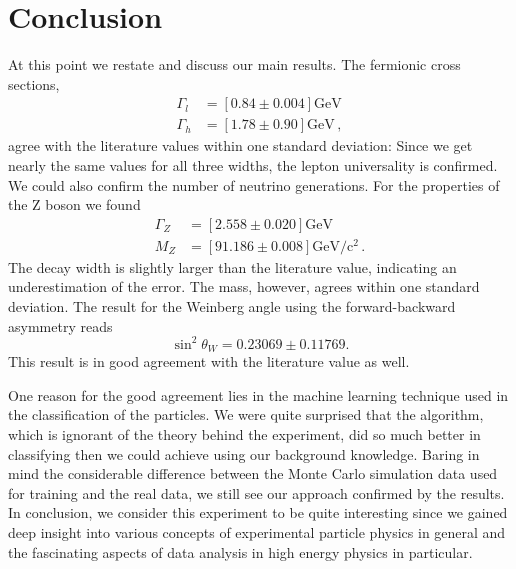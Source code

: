 \section{Conclusion}
At this point we restate and discuss our main results.
The fermionic cross sections, 
\begin{align*}
    \Gamma_l &=  \left[ 0.84 \pm 0.004 \right]\mathrm{GeV}\\ 
    \Gamma_h &=  \left[ 1.78 \pm 0.90 \right] \mathrm{GeV} \, ,
\end{align*}
agree with the literature values within one standard deviation:
Since we get nearly the same values for all three widths, the lepton universality is confirmed. We could also
confirm the number of neutrino generations.
For the properties of the Z boson we found
\begin{align*}
    \Gamma_Z  &= \left[ 2.558 \pm 0.020 \right] \mathrm{GeV}\\
    M_Z &= \left[ 91.186 \pm 0.008 \right] \mathrm{GeV / c^2} \, . 
\end{align*}
The decay width is slightly larger than the literature value, indicating an underestimation of the error. 
The mass, however, agrees within one standard deviation.
The result for the Weinberg angle using the forward-backward asymmetry reads
\begin{equation*}
   \sin^2 \theta_W = 0.23069 \pm 0.11769.
\end{equation*}
This result is in good agreement with the literature value as well.

One reason for the good agreement lies in the machine learning technique used in the classification
of the particles. We were quite surprised that the algorithm, which is ignorant of the theory behind the
experiment, did so much better in classifying then we could achieve using our background knowledge. 
Baring in mind the considerable difference between the Monte Carlo simulation data used for training and the real 
data, we still see our approach confirmed by the results. 
\\
In conclusion, we consider this experiment to be quite interesting since we gained deep 
insight into various concepts of experimental particle physics in general and the
fascinating aspects of data analysis in high energy physics in particular.
